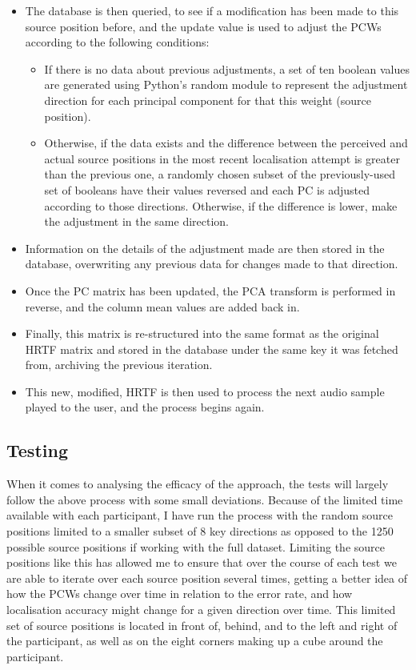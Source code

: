 \begin{itemize}
\item The database is then queried, to see if a modification has been made to this source position before, and the update value is used to adjust the PCWs according to the following conditions:
\begin{itemize}
\item If there is no data about previous adjustments, a set of ten boolean values are generated using Python's random module\citep{python random} to represent the adjustment direction for each principal component for that this weight (source position). 
\item Otherwise, if the data exists and the difference between the perceived and actual source positions in the most recent localisation attempt is greater than the previous one, a randomly chosen subset of the previously-used set of booleans have their values reversed and each PC is adjusted according to those directions. Otherwise, if the difference is lower, make the adjustment in the same direction. 
\end{itemize}
\item Information on the details of the adjustment made are then stored in the database, overwriting any previous data for changes made to that direction.
\item Once the PC matrix has been updated, the PCA transform is performed in reverse, and the column mean values are added back in.
\item Finally, this matrix is re-structured into the same format as the original HRTF matrix and stored in the database under the same key it was fetched from, archiving the previous iteration. 
\item This new, modified, HRTF is then used to process the next audio sample played to the user, and the process begins again. 
\end{itemize}

\subsection{Testing}
When it comes to analysing the efficacy of the approach, the tests will largely follow the above process with some small deviations. Because of the limited time available with each participant, I have run the process with the random source positions limited to a smaller subset of 8 key directions as opposed to the 1250 possible source positions if working with the full dataset. Limiting the source positions like this has allowed me to ensure that over the course of each test we are able to iterate over each source position several times, getting a better idea of how the PCWs change over time in relation to the error rate, and how localisation accuracy might change for a given direction over time. This limited set of source positions is located in front of, behind, and to the left and right of the participant, as well as on the eight corners making up a cube around the participant.

